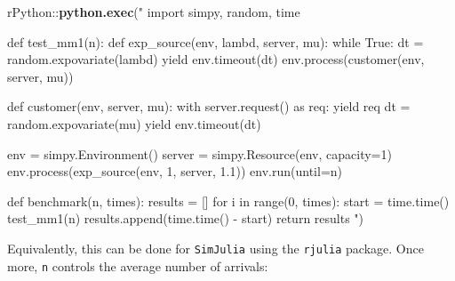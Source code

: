\documentclass[twoside,nohyper]{tufte-book}
\newenvironment{Shaded}{}{}
\newcommand{\KeywordTok}[1]{\textcolor[rgb]{0.00,0.44,0.13}{\textbf{#1}}}
\newcommand{\StringTok}[1]{\textcolor[rgb]{0.25,0.44,0.63}{#1}}
\newcommand{\OperatorTok}[1]{\textcolor[rgb]{0.40,0.40,0.40}{#1}}
\newcommand{\NormalTok}[1]{#1}
\theoremstyle{definition}
\theoremstyle{definition}
\theoremstyle{definition}
\theoremstyle{remark}
\begin{document}
\begin{Shaded}
\begin{Highlighting}[]
\NormalTok{rPython}\OperatorTok{::}\KeywordTok{python.exec}\NormalTok{(}\StringTok{"}
\StringTok{import simpy, random, time}

\StringTok{def test_mm1(n):}
\StringTok{  def exp_source(env, lambd, server, mu):}
\StringTok{      while True:}
\StringTok{          dt = random.expovariate(lambd)}
\StringTok{          yield env.timeout(dt)}
\StringTok{          env.process(customer(env, server, mu))}

\StringTok{  def customer(env, server, mu):}
\StringTok{      with server.request() as req:}
\StringTok{          yield req}
\StringTok{          dt = random.expovariate(mu)}
\StringTok{          yield env.timeout(dt)}

\StringTok{  env = simpy.Environment()}
\StringTok{  server = simpy.Resource(env, capacity=1)}
\StringTok{  env.process(exp_source(env, 1, server, 1.1))}
\StringTok{  env.run(until=n)}

\StringTok{def benchmark(n, times):}
\StringTok{  results = []}
\StringTok{  for i in range(0, times):}
\StringTok{    start = time.time()}
\StringTok{    test_mm1(n)}
\StringTok{    results.append(time.time() - start)}
\StringTok{  return results}
\StringTok{"}\NormalTok{)}
\end{Highlighting}
\end{Shaded}

Equivalently, this can be done for \texttt{SimJulia} using the
\texttt{rjulia}
package\cite[0pt]{GitHub:rJulia}.
Once more, \texttt{n} controls the average number of arrivals:
\end{document}
